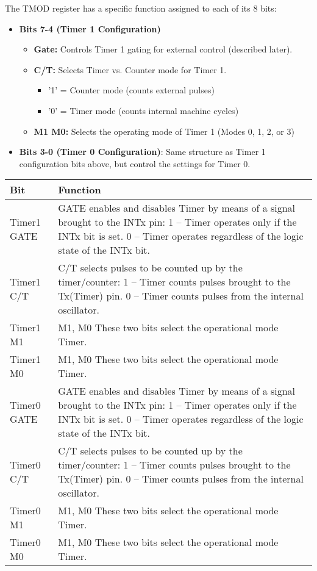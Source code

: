 \documentclass[
]{article}
\begin{document}
The TMOD register has a specific function assigned to each of its 8
bits:

\begin{itemize}
\item
  \textbf{Bits 7-4 (Timer 1 Configuration)}

  \begin{itemize}
  \item
    \textbf{Gate:} Controls Timer 1 gating for external control
    (described later).
  \item
    \textbf{C/T̄:} Selects Timer vs. Counter mode for Timer 1.

    \begin{itemize}
    \item
      '1' = Counter mode (counts external pulses)
    \item
      '0' = Timer mode (counts internal machine cycles)
    \end{itemize}
  \item
    \textbf{M1 M0:} Selects the operating mode of Timer 1 (Modes 0, 1,
    2, or 3)
  \end{itemize}
\item
  \textbf{Bits 3-0 (Timer 0 Configuration)}: Same structure as Timer 1
  configuration bits above, but control the settings for Timer 0.
\end{itemize}

\begin{longtable}[]{@{}ll@{}}
\toprule
Bit & Function \\
\midrule
\endhead
Timer1 GATE & GATE enables and disables Timer by means of a signal
brought to the INTx pin: 1 -- Timer operates only if the INTx bit is
set. 0 -- Timer operates regardless of the logic state of the INTx
bit. \\
Timer1 C/T & C/T selects pulses to be counted up by the timer/counter: 1
-- Timer counts pulses brought to the Tx(Timer) pin. 0 -- Timer counts
pulses from the internal oscillator. \\
Timer1 M1 & M1, M0 These two bits select the operational mode Timer. \\
Timer1 M0 & M1, M0 These two bits select the operational mode Timer. \\
Timer0 GATE & GATE enables and disables Timer by means of a signal
brought to the INTx pin: 1 -- Timer operates only if the INTx bit is
set. 0 -- Timer operates regardless of the logic state of the INTx
bit. \\
Timer0 C/T & C/T selects pulses to be counted up by the timer/counter: 1
-- Timer counts pulses brought to the Tx(Timer) pin. 0 -- Timer counts
pulses from the internal oscillator. \\
Timer0 M1 & M1, M0 These two bits select the operational mode Timer. \\
Timer0 M0 & M1, M0 These two bits select the operational mode Timer. \\
\bottomrule
\end{longtable}
\end{document}
